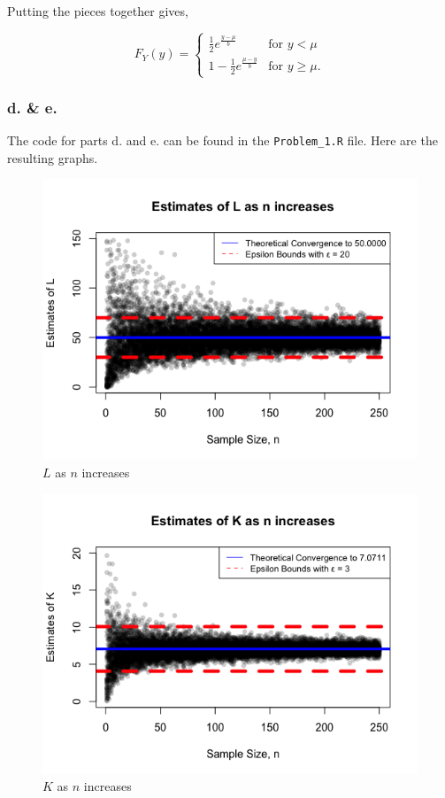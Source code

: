 \documentclass[12pt]{article}
\begin{document}
Putting the pieces together gives,

$$F_Y(y) = \begin{cases}
 \frac{1}{2} e^{\frac{y-\mu }{b}} & \text{for } y <\mu \\
1 - \frac{ 1 }{ 2 } e^{\frac{ \mu - y }{ b }} &  \text{for } y \geq\mu.
\end{cases}$$

\subsubsection{d. \& e.}

The code for parts d. and e. can be found in the \lstinline{Problem_1.R} file. Here are the resulting graphs.



\begin{figure}[H]
	\centering
	\includegraphics[scale = 0.6]{img/problem1/n_vs_Ln.png}
	\caption{$L$ as $n$ increases}
\end{figure}

\begin{figure}[H]
	\centering
	\includegraphics[scale = 0.6]{img/problem1/n_vs_Kn.png}
	\caption{$K$ as $n$ increases}
\end{figure}
\end{document}
